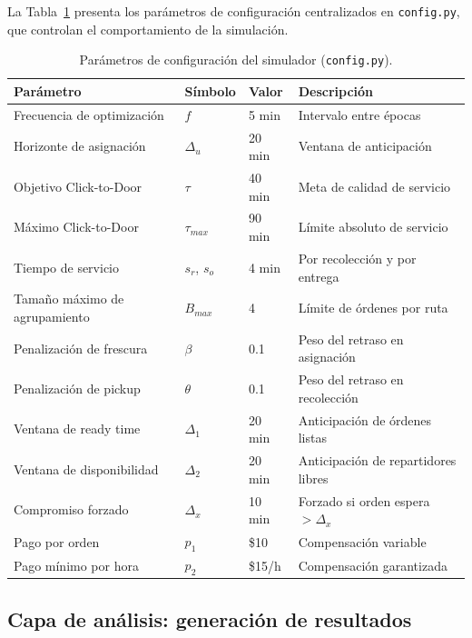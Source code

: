 \documentclass[12pt,letterpaper,oneside]{book}
\begin{document}
	La Tabla~\ref{tab:config_params} presenta los parámetros de configuración centralizados en 
	\texttt{config.py}, que controlan el comportamiento de la simulación.

	\begin{table}[htbp]
	\centering
	\caption{Parámetros de configuración del simulador (\texttt{config.py}).}
	\label{tab:config_params}
	\begin{tabular}{@{}llll@{}}
	\toprule
	\textbf{Parámetro} & \textbf{Símbolo} & \textbf{Valor} & \textbf{Descripción} \\
	\midrule
	Frecuencia de optimización     & $f$           & 5 min  & Intervalo entre épocas \\
	Horizonte de asignación        & $\Delta_u$    & 20 min & Ventana de anticipación \\
	Objetivo Click-to-Door         & $\tau$        & 40 min & Meta de calidad de servicio \\
	Máximo Click-to-Door           & $\tau_{max}$  & 90 min & Límite absoluto de servicio \\
	Tiempo de servicio             & $s_r$, $s_o$  & 4 min  & Por recolección y por entrega \\
	Tamaño máximo de agrupamiento  & $B_{max}$     & 4      & Límite de órdenes por ruta \\
	Penalización de frescura       & $\beta$       & 0.1    & Peso del retraso en asignación \\
	Penalización de pickup         & $\theta$      & 0.1    & Peso del retraso en recolección \\
	Ventana de ready time          & $\Delta_1$    & 20 min & Anticipación de órdenes listas \\
	Ventana de disponibilidad      & $\Delta_2$    & 20 min & Anticipación de repartidores libres \\
	Compromiso forzado             & $\Delta_x$    & 10 min & Forzado si orden espera $>\Delta_x$ \\
	Pago por orden                 & $p_1$         & \$10   & Compensación variable \\
	Pago mínimo por hora           & $p_2$         & \$15/h & Compensación garantizada \\
	\bottomrule
	\end{tabular}
	\end{table}

\FloatBarrier
	\subsection{Capa de análisis: generación de resultados}
\end{document}
